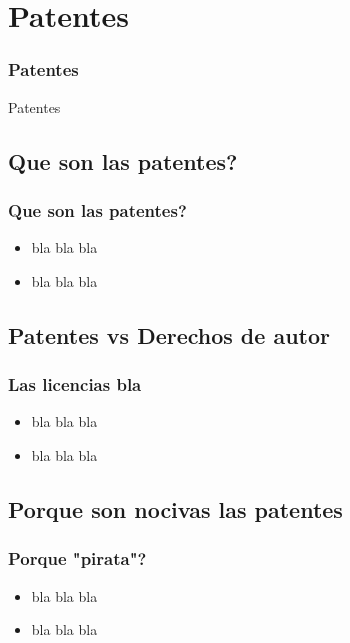 \section{Patentes}
\frame
{
	\frametitle{Patentes}
	\begin{center}
	Patentes
	\end{center}
}

\subsection{Que son las patentes?}
\frame
{
	\frametitle{Que son las patentes?}
	\begin{itemize}
	\item bla bla bla
	\item bla bla bla
	\end{itemize}
}

\subsection{Patentes vs Derechos de autor}
\frame
{
	\frametitle{Las licencias bla}
	\begin{itemize}
	\item bla bla bla
	\item  bla bla bla
	\end{itemize}
}

\subsection{Porque son nocivas las patentes}
\frame
{
	\frametitle{Porque "pirata"?}
	\begin{itemize}
	\item bla bla bla
	\item bla bla bla
	\end{itemize}
}


